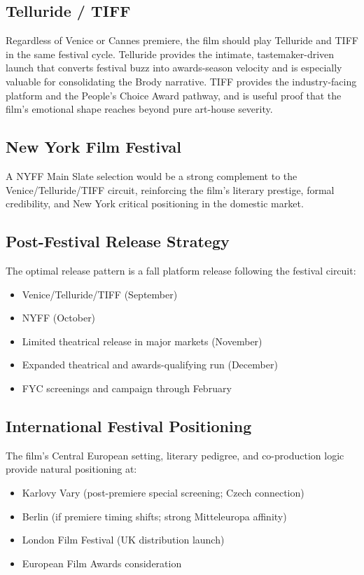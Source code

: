 \subsection{Telluride / TIFF}

Regardless of Venice or Cannes premiere, the film should play Telluride and TIFF in the same festival cycle. Telluride provides the intimate, tastemaker-driven launch that converts festival buzz into awards-season velocity and is especially valuable for consolidating the Brody narrative. TIFF provides the industry-facing platform and the People's Choice Award pathway, and is useful proof that the film's emotional shape reaches beyond pure art-house severity.

\subsection{New York Film Festival}

A NYFF Main Slate selection would be a strong complement to the Venice/Telluride/TIFF circuit, reinforcing the film's literary prestige, formal credibility, and New York critical positioning in the domestic market.

\subsection{Post-Festival Release Strategy}

The optimal release pattern is a fall platform release following the festival circuit:

\begin{itemize}[leftmargin=*]
\item Venice/Telluride/TIFF (September)
\item NYFF (October)
\item Limited theatrical release in major markets (November)
\item Expanded theatrical and awards-qualifying run (December)
\item FYC screenings and campaign through February
\end{itemize}

\subsection{International Festival Positioning}

The film's Central European setting, literary pedigree, and co-production logic provide natural positioning at:
\begin{itemize}[leftmargin=*]
\item Karlovy Vary (post-premiere special screening; Czech connection)
\item Berlin (if premiere timing shifts; strong Mitteleuropa affinity)
\item London Film Festival (UK distribution launch)
\item European Film Awards consideration
\end{itemize}

